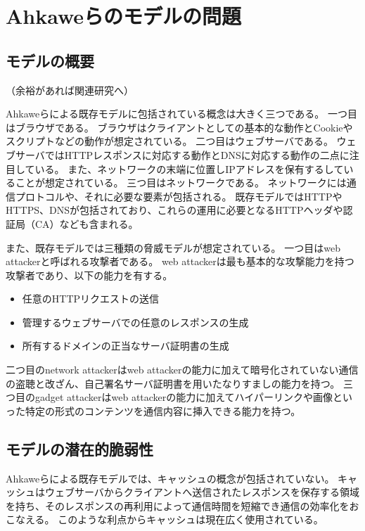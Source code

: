 \documentclass{css}
\begin{document}
\section{Ahkaweらのモデルの問題}

\subsection{モデルの概要}
\label{sec:existingmodel}
\color{red}
（余裕があれば関連研究へ）
\color{black}

Ahkaweらによる既存モデル\cite{webmodel}に包括されている概念は大きく三つである。
一つ目はブラウザである。
ブラウザはクライアントとしての基本的な動作とCookieやスクリプトなどの動作が想定されている。
二つ目はウェブサーバである。
ウェブサーバではHTTPレスポンスに対応する動作とDNSに対応する動作の二点に注目している。
また、ネットワークの末端に位置しIPアドレスを保有するしていることが想定されている。
三つ目はネットワークである。
ネットワークには通信プロトコルや、それに必要な要素が包括される。
既存モデルではHTTPやHTTPS、DNSが包括されており、これらの運用に必要となるHTTPヘッダや認証局（CA）なども含まれる。

また、既存モデルでは三種類の脅威モデルが想定されている。
一つ目はweb attackerと呼ばれる攻撃者である。
web attackerは最も基本的な攻撃能力を持つ攻撃者であり、以下の能力を有する。
\begin{itemize}
\item 任意のHTTPリクエストの送信
\item 管理するウェブサーバでの任意のレスポンスの生成
\item 所有するドメインの正当なサーバ証明書の生成
\end{itemize}
二つ目のnetwork attackerはweb attackerの能力に加えて暗号化されていない通信の盗聴と改ざん、自己署名サーバ証明書を用いたなりすましの能力を持つ。
三つ目のgadget attackerはweb attackerの能力に加えてハイパーリンクや画像といった特定の形式のコンテンツを通信内容に挿入できる能力を持つ。

\subsection{モデルの潜在的脆弱性}
\label{sec:problem}
Ahkaweらによる既存モデル\cite{webmodel}では、キャッシュの概念が包括されていない。
キャッシュはウェブサーバからクライアントへ送信されたレスポンスを保存する領域を持ち、そのレスポンスの再利用によって通信時間を短縮でき通信の効率化をおこなえる。
このような利点からキャッシュは現在広く使用されている。
\end{document}
